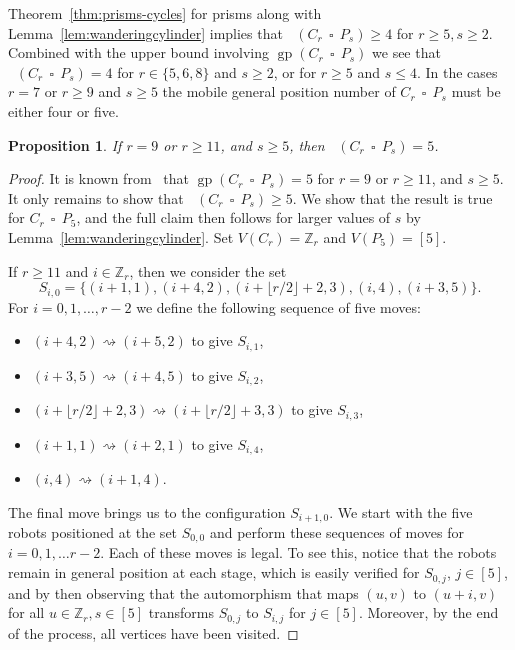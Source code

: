 \documentclass[a4paper,12pt]{article}
\DeclareMathOperator{\mob}{Mob_{gp}}
\DeclareMathOperator{\gp}{gp}
\DeclareMathOperator{\cp}{\,\square\,}
\newtheorem{proposition}[theorem]{Proposition}
\theoremstyle{definition}
\newcommand{\move}{\rightsquigarrow}
\begin{document}
	Theorem~\ref{thm:prisms-cycles} for prisms along with Lemma~\ref{lem:wanderingcylinder} implies that $\mob (C_r \cp P_s) \geq 4$ for $r \geq 5, s \geq 2$. Combined with the upper bound involving $\gp (C_r \cp P_s)$ we see that $\mob (C_r \cp P_s) = 4$ for $r \in \{ 5,6,8\} $ and $s \geq 2$, or for $r \geq 5$ and $s \leq 4$. In the cases $r = 7$ or $r \geq 9$ and $s \geq 5$ the mobile general position number of $C_r \cp P_s$ must be either four or five.
	
	\begin{proposition}\label{prop:cylinders}
		If $r = 9$ or $r \geq 11$, and $s \geq 5$, then $\mob(C_r \cp P_s) = 5$. 
	\end{proposition}
	
	\begin{proof}
		It is known from~\cite[Theorem 3.2]{klavzar-2021} that $\gp (C_r \cp P_s) = 5$ for $r = 9$ or $r \geq 11$, and $s \geq 5$. It only remains to show that $\mob(C_r \cp P_s) \geq 5$. We show that the result is true for $C_r \cp P_5$, and the full claim then follows for larger values of $s$ by Lemma~\ref{lem:wanderingcylinder}. Set $V(C_r) = \mathbb{Z}_r$ and $V(P_5) = [5]$. 
		
		If $r \geq 11$ and $i \in \mathbb{Z}_r$, then we consider the set
		\[ S_{i,0}  = \{(i+1,1),(i+4,2),(i+\lfloor{r/2}\rfloor+2,3),(i,4),(i+3,5)\} .\]
		For $i = 0,1,\dots ,r-2$ we define the following sequence of five moves:
		\begin{itemize}
			\item $(i+4,2) \move (i+5,2)$ to give $S_{i,1}$,
			\item $(i+3,5) \move (i+4,5)$ to give $S_{i,2}$,
			\item $(i+\lfloor{r/2}\rfloor+2,3) \move (i+\lfloor{r/2}\rfloor+3,3)$ to give $S_{i,3}$,
			\item $(i+1,1) \move (i+2,1)$ to give $S_{i,4}$,
			\item $(i,4) \move (i+1,4)$.
		\end{itemize}
		The final move brings us to the configuration $S_{i+1,0}$. We start with the five robots positioned at the set $S_{0,0}$ and perform these sequences of moves for $i = 0,1,\dots r-2$. Each of these moves is legal. To see this, notice that the robots remain in general position at each stage, which is easily verified for $S_{0,j}$, $j \in [5]$, and by then observing that the automorphism that maps $(u,v)$ to $(u+i,v)$ for all $u \in \mathbb{Z}_r,s \in [5]$ transforms $S_{0,j}$ to $S_{i,j}$ for $j \in [5]$. Moreover, by the end of the process, all vertices have been visited.
		

\end{proof}
\end{document}
